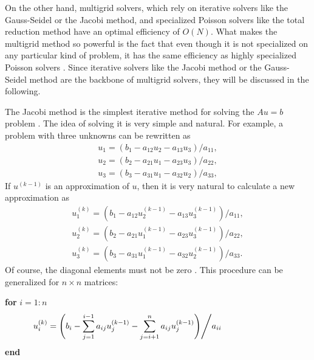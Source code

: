 On the other hand, multigrid solvers, which rely on iterative solvers like the Gauss-Seidel or the Jacobi method, and specialized Poisson solvers like the total reduction method have an optimal efficiency of $O(N)$. What makes the multigrid method so powerful is the fact that even though it is not specialized on any particular kind of problem, it has the same efficiency as highly specialized Poisson solvers \cite{Trottenberg:2000:MUL:374106}. Since iterative solvers like the Jacobi method or the Gauss-Seidel method are the backbone of multigrid solvers, they will be discussed in the following.



The Jacobi method is the simplest iterative method for solving the $Au = b$ problem \cite{golub1996matrix}. The idea of solving it is very simple and natural. For example, a problem with three unknowns can be rewritten as
\begin{align}
u_1 = (b_1 - a_{12}u_2 - a_{13}u_3) \big/ a_{11},\nonumber \\
u_2 = (b_2 - a_{21}u_1 - a_{23}u_3) \big/ a_{22}, \\
u_3 = (b_3 - a_{31}u_1 - a_{32}u_2) \big/ a_{33},\nonumber
\end{align}
If $u^{(k-1)}$ is an approximation of $u$, then it is very natural to calculate a new approximation as 
\begin{align}
u_1^{(k)} = (b_1 - a_{12}u_2^{(k-1)} - a_{13}u_3^{(k-1)}) \big/ a_{11},\nonumber \\
u_2^{(k)} = (b_2 - a_{21}u_1^{(k-1)} - a_{23}u_3^{(k-1)}) \big/ a_{22}, \\
u_3^{(k)} = (b_3 - a_{31}u_1^{(k-1)} - a_{32}u_2^{(k-1)}) \big/ a_{33}.\nonumber
\end{align}
Of course, the diagonal elements must not be zero \cite{golub1996matrix}. This procedure can be generalized for  $n \times n$ matrices:

\noindent\hspace*{15mm}\textbf{for } $i = 1:n$
\begin{align}
\hspace*{-25mm} u_i^{(k)} = \Bigg ( b_i - \sum_{j = 1}^{i-1} a_{ij}u_j^{(k-1)} - \sum_{j = i+1}^{n} a_{ij}u_j^{(k-1)} \Bigg ) \Bigg / a_{ii}
\end{align}
\hspace*{15mm}\textbf{end}

